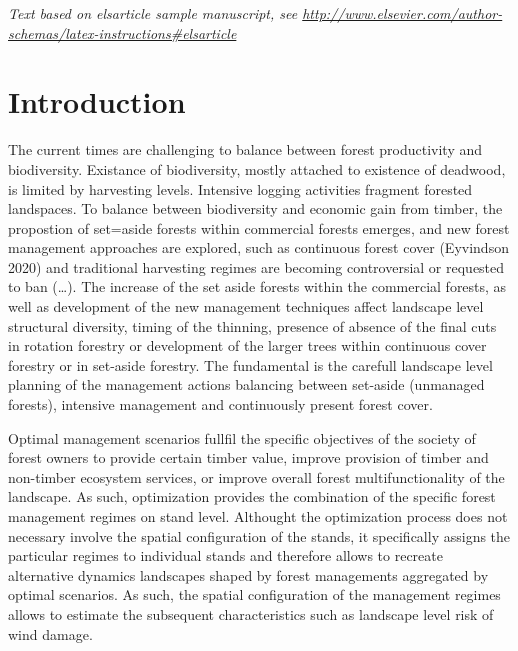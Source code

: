 \documentclass[]{elsarticle} %
\begin{document}
\newpage

\emph{Text based on elsarticle sample manuscript, see
\url{http://www.elsevier.com/author-schemas/latex-instructions\#elsarticle}}

\section{Introduction}\label{introduction}

The current times are challenging to balance between forest productivity
and biodiversity. Existance of biodiversity, mostly attached to
existence of deadwood, is limited by harvesting levels. Intensive
logging activities fragment forested landspaces. To balance between
biodiversity and economic gain from timber, the propostion of set=aside
forests within commercial forests emerges, and new forest management
approaches are explored, such as continuous forest cover (Eyvindson
2020) and traditional harvesting regimes are becoming controversial or
requested to ban (\ldots{}). The increase of the set aside forests
within the commercial forests, as well as development of the new
management techniques affect landscape level structural diversity,
timing of the thinning, presence of absence of the final cuts in
rotation forestry or development of the larger trees within continuous
cover forestry or in set-aside forestry. The fundamental is the carefull
landscape level planning of the management actions balancing between
set-aside (unmanaged forests), intensive management and continuously
present forest cover.

Optimal management scenarios fullfil the specific objectives of the
society of forest owners to provide certain timber value, improve
provision of timber and non-timber ecosystem services, or improve
overall forest multifunctionality of the landscape. As such,
optimization provides the combination of the specific forest management
regimes on stand level. Althought the optimization process does not
necessary involve the spatial configuration of the stands, it
specifically assigns the particular regimes to individual stands and
therefore allows to recreate alternative dynamics landscapes shaped by
forest managements aggregated by optimal scenarios. As such, the spatial
configuration of the management regimes allows to estimate the
subsequent characteristics such as landscape level risk of wind damage.
\end{document}
